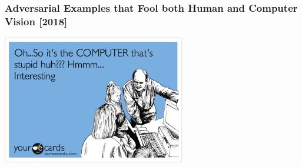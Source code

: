 \documentclass[9pt]{beamer}
\begin{document}
\begin{frame}
  \frametitle{Adversarial Examples that Fool both Human and Computer
    Vision [2018]}

  \begin{center}
    \includegraphics[width = 8cm]{images/stupid_computer.png}
  \end{center}

\end{frame}
\end{document}
